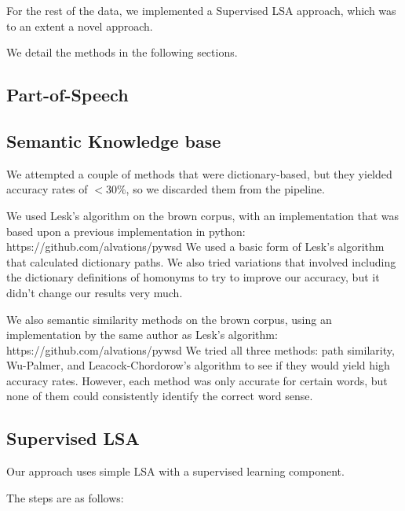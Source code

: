 \documentclass[10pt, letterpaper]{article}
\begin{document}
	 For the rest of the data, we implemented a Supervised LSA approach, which was to
	 an extent a novel approach. 

	 We detail the methods in the following sections. 
 	\subsection{Part-of-Speech}
 	\subsection{Semantic Knowledge base}
        We attempted a couple of methods that were dictionary-based, but they yielded accuracy rates of $ < 30\%$, so we discarded them from the pipeline.

        We used Lesk's algorithm on the brown corpus, with an implementation that was based upon a previous implementation in python: https://github.com/alvations/pywsd We used a basic form of Lesk's algorithm that calculated dictionary paths. We also tried variations that involved including the dictionary definitions of homonyms to try to improve our accuracy, but it didn't change our results very much.

        We also semantic similarity methods on the brown corpus, using an implementation by the same author as Lesk's algorithm: https://github.com/alvations/pywsd  We tried all three methods: path similarity, Wu-Palmer, and Leacock-Chordorow's algorithm to see if they would yield high accuracy rates. However, each method was only accurate for certain words, but none of them could consistently identify the correct word sense.
	\subsection{Supervised LSA}
	Our approach uses simple LSA with a supervised learning component. 

	The steps are as follows: 
\end{document}
